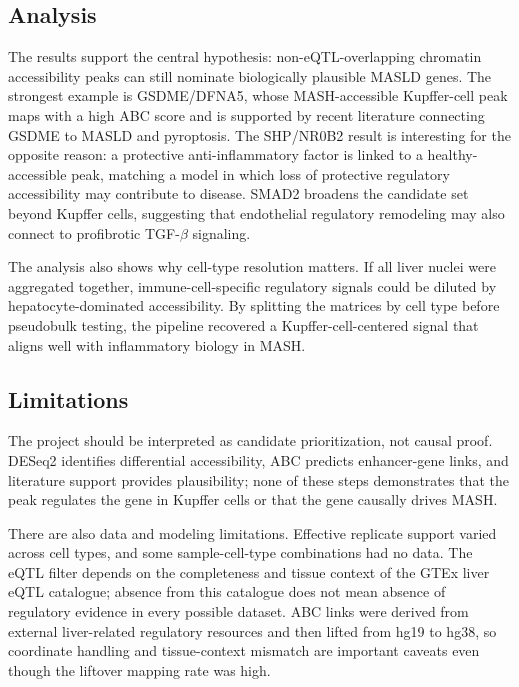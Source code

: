 \documentclass[11pt]{article}
\begin{document}
  \subsection{Analysis}\label{subsec:analysis}
  The results support the central hypothesis: non-eQTL-overlapping chromatin accessibility peaks can still nominate biologically plausible MASLD genes.
  The strongest example is GSDME/DFNA5, whose MASH-accessible Kupffer-cell peak maps with a high ABC score and is supported by recent literature connecting GSDME to MASLD and pyroptosis.
  The SHP/NR0B2 result is interesting for the opposite reason: a protective anti-inflammatory factor is linked to a healthy-accessible peak, matching a model in which loss of protective regulatory accessibility may contribute to disease.
  SMAD2 broadens the candidate set beyond Kupffer cells, suggesting that endothelial regulatory remodeling may also connect to profibrotic TGF-\(\beta\) signaling.

  The analysis also shows why cell-type resolution matters.
  If all liver nuclei were aggregated together, immune-cell-specific regulatory signals could be diluted by hepatocyte-dominated accessibility.
  By splitting the matrices by cell type before pseudobulk testing, the pipeline recovered a Kupffer-cell-centered signal that aligns well with inflammatory biology in MASH.

  \subsection{Limitations}\label{subsec:limitations}
  The project should be interpreted as candidate prioritization, not causal proof.
  DESeq2 identifies differential accessibility, ABC predicts enhancer-gene links, and literature support provides plausibility; none of these steps demonstrates that the peak regulates the gene in Kupffer cells or that the gene causally drives MASH.

  There are also data and modeling limitations.
  Effective replicate support varied across cell types, and some sample-cell-type combinations had no data.
  The eQTL filter depends on the completeness and tissue context of the GTEx liver eQTL catalogue; absence from this catalogue does not mean absence of regulatory evidence in every possible dataset.
  ABC links were derived from external liver-related regulatory resources and then lifted from hg19 to hg38, so coordinate handling and tissue-context mismatch are important caveats even though the liftover mapping rate was high.
\end{document}
